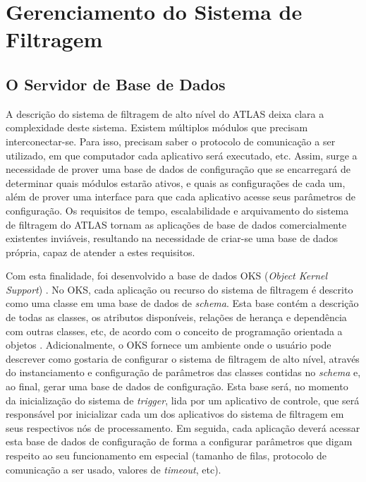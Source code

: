 \chapter{Gerenciamento do Sistema de Filtragem}
\label{chap:pm}

\section{O Servidor de Base de Dados}
\label{sec:oks}

A descrição do sistema de filtragem de alto nível do ATLAS deixa clara a complexidade deste sistema. Existem múltiplos módulos que precisam interconectar-se. Para isso, precisam saber o protocolo de comunicação a ser utilizado, em que computador cada aplicativo será executado, etc. Assim, surge a necessidade de prover uma base de dados de configuração que se encarregará de determinar quais módulos estarão ativos, e quais as configurações de cada um, além de prover uma interface para que cada aplicativo acesse seus parâmetros de configuração. Os requisitos de tempo, escalabilidade e arquivamento do sistema de filtragem do ATLAS tornam as aplicações de base de dados comercialmente existentes inviáveis, resultando na necessidade de criar-se uma base de dados própria, capaz de atender a estes requisitos. 

Com esta finalidade, foi desenvolvido a base de dados OKS (\emph{Object Kernel Support}) \cite{bib:paper_oks}. No OKS, cada aplicação ou recurso do sistema de filtragem é descrito como uma classe em uma base de dados de \emph{schema}. Esta base contém a descrição de todas as classes, os atributos disponíveis, relações de herança e dependência com outras classes, etc, de acordo com o conceito de programação orientada a objetos \cite{bib:poo}. Adicionalmente, o OKS fornece um ambiente onde o usuário pode descrever como gostaria de configurar o sistema de filtragem de alto nível, através do instanciamento e configuração de parâmetros das classes contidas no \emph{schema} e, ao final, gerar uma base de dados de configuração. Esta base será, no momento da inicialização do sistema de \emph{trigger}, lida por um aplicativo de controle, que será responsável por inicializar cada um dos aplicativos do sistema de filtragem em seus respectivos nós de processamento. Em seguida, cada aplicação deverá acessar esta base de dados de configuração de forma a configurar parâmetros que digam respeito ao seu funcionamento em especial (tamanho de filas, protocolo de comunicação a ser usado, valores de \emph{timeout}, etc).  

